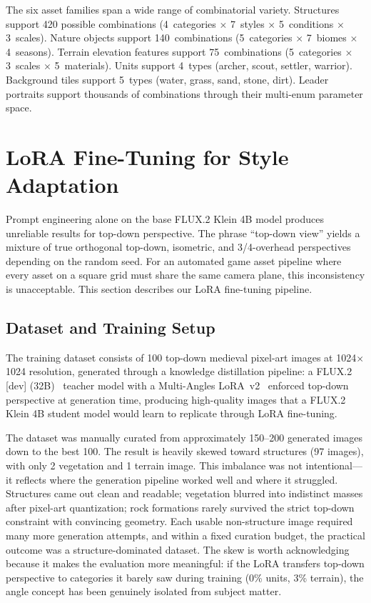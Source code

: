 \documentclass[conference]{IEEEtran}
\begin{document}
The six asset families span a wide range of combinatorial variety.
Structures support 420 possible combinations (4~categories $\times$
7~styles $\times$ 5~conditions $\times$ 3~scales). Nature objects support
140~combinations (5~categories $\times$ 7~biomes $\times$ 4~seasons).
Terrain elevation features support 75~combinations (5~categories $\times$
3~scales $\times$ 5~materials). Units support 4~types (archer, scout,
settler, warrior). Background tiles support 5~types (water, grass, sand,
stone, dirt). Leader portraits support thousands of combinations through
their multi-enum parameter space.

\FloatBarrier
\section{LoRA Fine-Tuning for Style Adaptation}
\label{sec:lora}

Prompt engineering alone on the base FLUX.2 Klein 4B model produces
unreliable results for top-down perspective. The phrase ``top-down view''
yields a mixture of true orthogonal top-down, isometric, and 3/4-overhead
perspectives depending on the random seed. For an automated game asset
pipeline where every asset on a square grid must share the same camera
plane, this inconsistency is unacceptable. This section describes our LoRA
fine-tuning pipeline.

\subsection{Dataset and Training Setup}

The training dataset consists of 100 top-down medieval pixel-art images at
1024$\times$1024 resolution, generated through a knowledge distillation
pipeline: a FLUX.2 [dev] (32B)~\cite{blackforestlabs2025flux2} teacher model with a Multi-Angles LoRA~v2~\cite{lovis2025multiangles}
enforced top-down perspective at generation time, producing high-quality
images that a FLUX.2 Klein 4B student model would learn to replicate
through LoRA fine-tuning.

The dataset was manually curated from approximately 150--200 generated
images down to the best 100. The result is heavily skewed toward
structures (97 images), with only 2 vegetation and 1 terrain image.
This imbalance was not intentional---it reflects where the generation
pipeline worked well and where it struggled. Structures came out clean
and readable; vegetation blurred into indistinct masses after pixel-art
quantization; rock formations rarely survived the strict top-down
constraint with convincing geometry. Each usable non-structure image
required many more generation attempts, and within a fixed curation
budget, the practical outcome was a structure-dominated dataset. The
skew is worth acknowledging because it makes the evaluation more
meaningful: if the LoRA transfers top-down perspective to categories it
barely saw during training (0\% units, 3\% terrain), the angle concept
has been genuinely isolated from subject matter.
\end{document}
